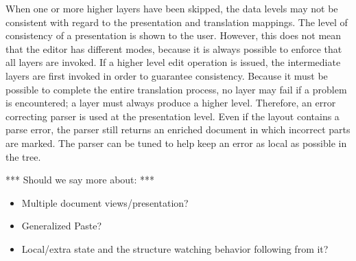 When one or more higher layers have been skipped, the data levels may not be consistent with regard to the presentation and translation mappings. The level of consistency of a presentation is shown to the user. However, this does not mean that the editor has different modes, because it is always possible to enforce that all layers are invoked. If a higher level edit operation is issued, the intermediate layers are first invoked in order to guarantee consistency. Because it must be possible to complete the entire translation process, no layer may fail if a problem is encountered; a layer must always produce a higher level. Therefore, an error correcting parser is used at the presentation level. Even if the layout contains a parse error, the parser still returns an enriched document in which incorrect parts are marked. The parser can be tuned to help keep an error as local as possible in the tree.

 


*** Should we say more about: ***
\begin{itemize}
\item Multiple document views/presentation?
\item Generalized Paste?
\item Local/extra state and the structure watching behavior following from it?
\end{itemize}






